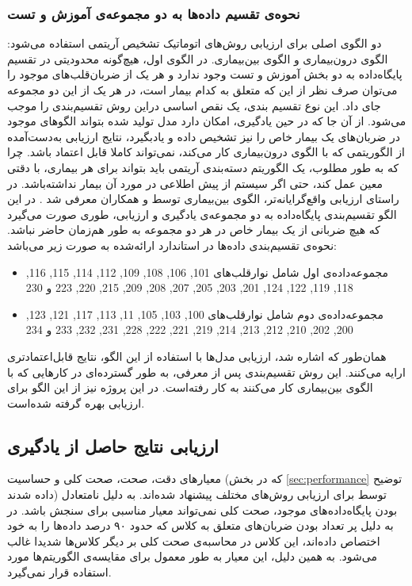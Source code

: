 		\subsubsection{نحوه‌ی تقسیم داده‌ها به دو مجموعه‌ی آموزش و تست}
		دو الگوی اصلی برای ارزیابی روش‌های اتوماتیک تشخیص آریتمی استفاده می‌شود: الگوی درون‌بیماری و الگوی بین‌بیماری. در الگوی اول، هیچ‌گونه محدودیتی در تقسیم پایگاه‌داده به دو بخش آموزش و تست وجود ندارد و هر یک از ضربان‌قلب‌های موجود را می‌توان صرف نظر از این که متعلق به کدام بیمار است، در هر یک از این دو مجموعه جای داد. این نوع تقسیم بندی، یک نقص اساسی دراین روش تقسیم‌بندی را موجب می‌شود. از آن جا که در حین یادگیری، امکان دارد مدل تولید شده بتواند الگوهای موجود در ضربان‌های یک بیمار خاص را نیز تشخیص داده و یادبگیرد، نتایج ارزیابی به‌دست‌آمده از الگوریتمی که با الگوی درون‌بیماری کار می‌کند، نمی‌تواند کاملا قابل اعتماد باشد. چرا که به طور مطلوب، یک الگوریتم دسته‌بندی آریتمی باید بتواند برای هر بیماری، با دقتی معین عمل کند، حتی اگر سیستم از پیش اطلاعی در مورد آن بیمار نداشته‌باشد. 
در راستای ارزیابی واقع‌گرایانه‌تر، الگوی بین‌بیماری توسط  و همکاران معرفی شد \cite{deChazal2004}. در این الگو تقسیم‌بندی پایگاه‌داده به دو مجموعه‌ی یادگیری و ارزیابی، طوری صورت می‌گیرد که هیچ ضربانی از یک بیمار خاص در هر دو مجموعه به طور هم‌زمان حاضر نباشد. نحوه‌ی تقسیم‌بندی داده‌ها در استاندارد ارائه‌شده به صورت زیر می‌باشد:
\begin{itemize}
	\item مجموعه‌داده‌ی اول  شامل نوارقلب‌های 101, 106, 108, 109, 112, 114, 115, 116, 118,
119, 122, 124, 201, 203, 205, 207, 208, 209, 215, 220, 223 و
230
	\item مجموعه‌داده‌ی دوم  شامل نوارقلب‌های 100, 103, 105, 11, 113, 117, 121, 123,
200, 202, 210, 212, 213, 214, 219, 221, 222, 228, 231, 232, 233
و 234
\end{itemize}
 همان‌طور که اشاره شد، ارزیابی مدل‌ها با استفاده از این الگو، نتایج قابل‌اعتمادتری ارایه می‌کنند. این روش تقسیم‌بندی پس از معرفی، به طور گسترده‌ای در کارهایی که با الگوی بین‌بیماری کار می‌کنند به کار رفته‌است. در این پروژه نیز از این الگو برای ارزیابی بهره گرفته شده‌است. 



	\subsection{ارزیابی نتایج حاصل از یادگیری}
	معیارهای دقت، صحت، صحت کلی و حساسیت (که در بخش \ref{sec:performance} توضیح داده شدند) توسط  برای ارزیابی روش‌های مختلف پیشنهاد شده‌اند. 
به دلیل نامتعادل بودن پایگاه‌داده‌های موجود، صحت کلی نمی‌تواند معیار مناسبی برای سنجش باشد. در به دلیل پر تعداد بودن ضربان‌های متعلق به کلاس  که حدود ۹۰ درصد داده‌ها را به خود اختصاص داده‌اند،‌ این کلاس در محاسبه‌ی صحت کلی بر دیگر کلاس‌ها شدیدا غالب می‌شود. به همین دلیل، این معیار به طور معمول برای مقایسه‌ی الگوریتم‌ها مورد استفاده قرار نمی‌گیرد.

